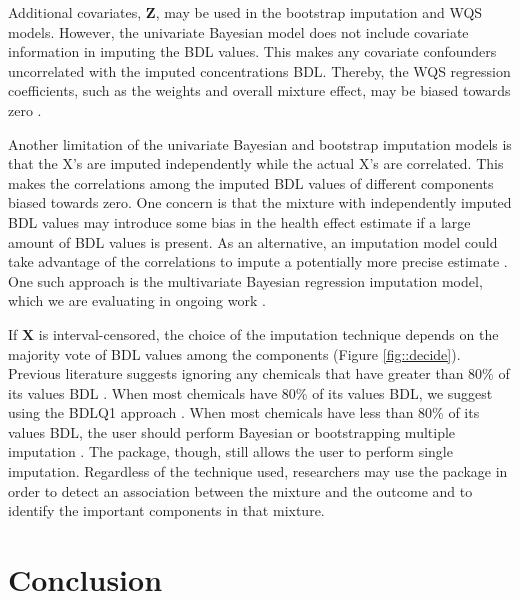 Additional covariates, \(\boldsymbol{Z}\), may be used in the bootstrap
imputation and WQS models. However, the univariate Bayesian model does
not include covariate information in imputing the BDL values. This makes
any covariate confounders uncorrelated with the imputed concentrations
BDL. Thereby, the WQS regression coefficients, such as the weights and
overall mixture effect, may be biased towards zero
\citep{forerMissingData2014, littleRegressionMissingReview1992}.

Another limitation of the univariate Bayesian and bootstrap imputation
models is that the X's are imputed independently while the actual X's
are correlated. This makes the correlations among the imputed BDL values
of different components biased towards zero. One concern is that the
mixture with independently imputed BDL values may introduce some bias in
the health effect estimate if a large amount of BDL values is present.
As an alternative, an imputation model could take advantage of the
correlations to impute a potentially more precise estimate
\citep{dongPrincipledMissingData2013, littleRegressionMissingReview1992}.
One such approach is the multivariate Bayesian regression imputation
model, which we are evaluating in ongoing work
\citep{hargartenAccountingUncertaintyDue2020}.

If \(\boldsymbol{X}\) is interval-censored, the choice of the imputation
technique depends on the majority vote of BDL values among the
components \citep{hargartenAccountingUncertaintyDue2020} (Figure
\ref{fig::decide}). Previous literature suggests ignoring any chemicals
that have greater than 80\% of its values BDL
\citep[pg.~93]{helselStatisticsCensoredEnvironmental2012}
\citep[pg. 14]{bolksBaselineAssessmentLeftCensored2014}. When most
chemicals have 80\% of its values BDL, we suggest using the BDLQ1
approach \citep{hargartenAccountingUncertaintyDue2020}. When most
chemicals have less than 80\% of its values BDL, the user should perform
Bayesian or bootstrapping multiple imputation
\citep{hargartenAccountingUncertaintyDue2020}. The  package,
though, still allows the user to perform single imputation. Regardless
of the technique used, researchers may use the  package in
order to detect an association between the mixture and the outcome and
to identify the important components in that mixture.

\hypertarget{conclusion}{%
\section{Conclusion}\label{conclusion}}

